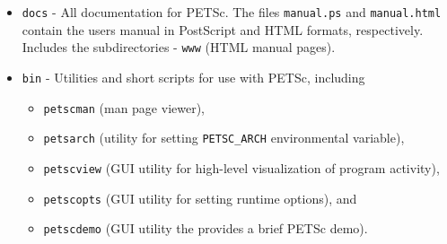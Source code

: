 {\begin{itemize}
\item {\tt docs} - All documentation for PETSc. The files {\tt manual.ps}
                   and {\tt manual.html} contain the users manual in
                   PostScript and HTML formats, respectively. Includes
                   the subdirectories
 \subitem - {\tt www} (HTML manual pages).
\item {\tt bin} - Utilities and short scripts for use with PETSc, including
 \begin{itemize}
 \item {\tt petscman} (man page viewer),
 \item {\tt petsarch} (utility for setting {\tt PETSC\_ARCH} environmental variable),
 \item {\tt petscview} (GUI utility for high-level visualization of program activity),
 \item {\tt petscopts} (GUI utility for setting runtime options), and
 \item {\tt petscdemo} (GUI utility the provides a brief PETSc demo).
 \end{itemize}


\end{itemize}}
